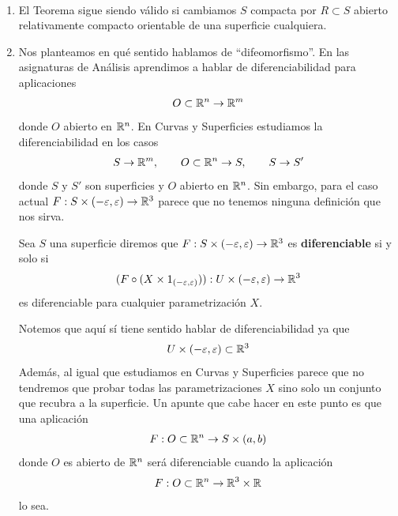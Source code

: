 \begin{observacion}\
    \begin{enumerate}
        \item El Teorema sigue siendo válido si cambiamos $S$ compacta por $R\subset S$ abierto relativamente compacto orientable de una superficie cualquiera.
        
        \item Nos planteamos en qué sentido hablamos de ``difeomorfismo''. En las asignaturas de Análisis aprendimos a hablar de diferenciabilidad para aplicaciones
        \begin{gather*}
            O\subset \mathbb{R}^n \to \mathbb{R}^m
        \end{gather*}
        donde $O$ abierto en $\mathbb{R}^n$. En Curvas y Superficies estudiamos la diferenciabilidad en los casos 
        \begin{gather*}
            S \to \mathbb{R}^m, \qquad O\subset \mathbb{R}^n \to S, \qquad S\to S'
        \end{gather*}
        donde $S$ y $S'$ son superficies y $O$ abierto en $\mathbb{R}^n$. Sin embargo, para el caso actual $F: S\times (-\varepsilon, \varepsilon) \to \mathbb{R}^3$ parece que no tenemos ninguna definición que nos sirva. 

        \begin{definicion}
            Sea $S$ una superficie diremos que $F: S\times (-\varepsilon, \varepsilon) \to \mathbb{R}^3$ es \textbf{diferenciable} si y solo si 
            \begin{gather*}
                (F \circ (X\times 1_{(-\varepsilon, \varepsilon)})) : U \times (-\varepsilon, \varepsilon) \to \mathbb{R}^3
            \end{gather*}
            es diferenciable para cualquier parametrización $X$.
        \end{definicion}

        Notemos que aquí sí tiene sentido hablar de diferenciabilidad ya que
        \begin{gather*}
            U\times(-\varepsilon, \varepsilon) \subset \mathbb{R}^3
        \end{gather*}
        Además, al igual que estudiamos en Curvas y Superficies parece que no tendremos que probar todas las parametrizaciones $X$ sino solo un conjunto que recubra a la superficie. Un apunte que cabe hacer en este punto es que una aplicación
        \begin{gather*}
            F : O\subset \mathbb{R}^n \to S \times (a,b)
        \end{gather*}
        donde $O$ es abierto de $\mathbb{R}^n$ será diferenciable cuando la aplicación
        \begin{gather*}
            F : O\subset \mathbb{R}^n \to \mathbb{R}^3 \times \mathbb{R}
        \end{gather*}
        lo sea.
    \end{enumerate}
\end{observacion}

